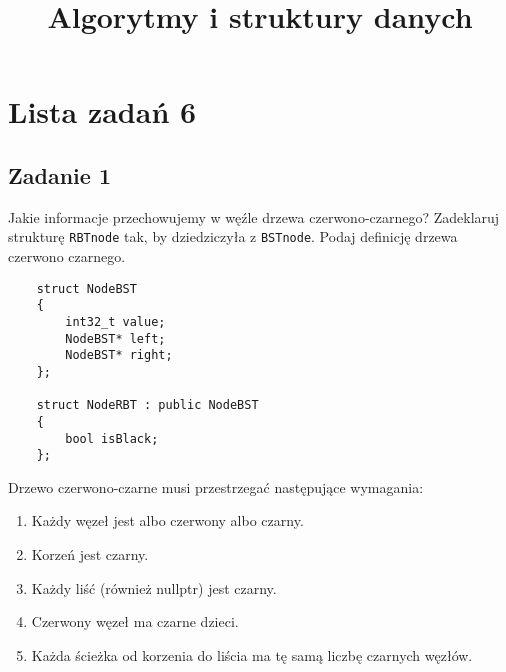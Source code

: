 \documentclass{article}
\begin{document}
\title{Algorytmy i struktury danych}
\author{}
\date{}
\maketitle

\section*{Lista zadań 6}

\subsection*{Zadanie 1}
Jakie informacje przechowujemy w węźle drzewa czerwono-czarnego?
Zadeklaruj strukturę \verb+RBTnode+ tak, by dziedziczyła z \verb+BSTnode+. Podaj definicję drzewa czerwono czarnego.
\begin{lstlisting}
    struct NodeBST
    {
        int32_t value;
        NodeBST* left;
        NodeBST* right;  
    };

    struct NodeRBT : public NodeBST
    {
        bool isBlack;
    };
\end{lstlisting}
Drzewo czerwono-czarne musi przestrzegać następujące wymagania:
\begin{enumerate}
    \item Każdy węzeł jest albo czerwony albo czarny.
    \item Korzeń jest czarny.
    \item Każdy liść (również nullptr) jest czarny.
    \item Czerwony węzeł ma czarne dzieci.
    \item Każda ścieżka od korzenia do liścia ma tę samą liczbę czarnych węzłów.
\end{enumerate}
\end{document}
